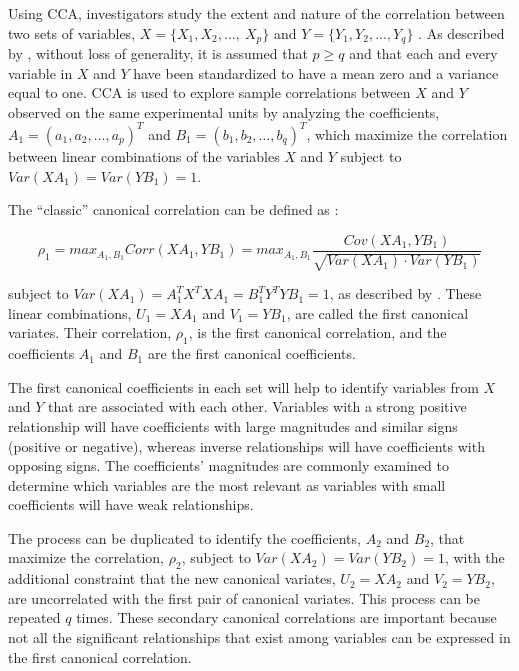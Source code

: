 Using CCA, investigators study the extent and nature of the correlation between two sets of variables, \(X = \{X_1, X_2,...,\ X_p\}\) and \(Y = \{Y_1, Y_2,\dots, Y_q\}\) \citep{hot1936}. As described by \citep{clark1975}, without loss of generality, it is assumed that \(p \geq q\) and that each and every variable in \(X\) and \(Y\) have been standardized to have a mean zero and a variance equal to one. CCA is used to explore sample correlations between \(X\) and \(Y\) observed on the same experimental units by analyzing the coefficients, \(A_1 = (a_1, a_2,\dots, a_p )^T\) and \(B_1 = (b_1, b_2,\dots, b_q )^T\), which maximize the correlation between linear combinations of the variables \(X\) and \(Y\) subject to \(Var(XA_1) = Var(YB_1) = 1\).

The ``classic'' canonical correlation can be defined as \citep{hot1936}:

\begin{equation}
\rho_1 = max_{A_1, B_1}Corr(XA_1, YB_1) = max_{A_1,B_1}\frac{Cov(XA_1, YB_1)}{\sqrt{Var(XA_1)\cdot Var(YB_1)}}
  \label{eq:canCorr}
\end{equation}

subject to \(Var(XA_1) = A_1^TX^TXA_1 = B_1^TY^TYB_1 = 1\), as described by \citep{hardoon2011}. These linear combinations, \(U_1 = XA_1\) and \(V_1 = YB_1\), are called the first canonical variates. Their correlation, \(\rho_1\), is the first canonical correlation, and the coefficients \(A_1\) and \(B_1\) are the first canonical coefficients.

The first canonical coefficients in each set will help to identify variables from \(X\) and \(Y\) that are associated with each other. Variables with a strong positive relationship will have coefficients with large magnitudes and similar signs (positive or negative), whereas inverse relationships will have coefficients with opposing signs. The coefficients' magnitudes are commonly examined to determine which variables are the most relevant as variables with small coefficients will have weak relationships.

The process can be duplicated to identify the coefficients, \(A_2\) and \(B_2\), that maximize the correlation, \(\rho_2\), subject to \(Var(XA_2) = Var(YB_2) = 1\), with the additional constraint that the new canonical variates, \(U_2 = XA_2\) and \(V_2 = YB_2\), are uncorrelated with the first pair of canonical variates. This process can be repeated \(q\) times. These secondary canonical correlations are important because not all the significant relationships that exist among variables can be expressed in the first canonical correlation.


